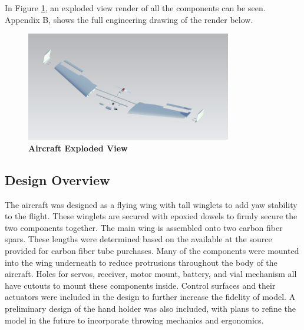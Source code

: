         In Figure \ref{fig:exploded}, an exploded view render of all the components can be seen. Appendix B, shows the full engineering drawing of the render below.
        
        \begin{figure}[H]
            \centering
            \includegraphics[width=0.8\textwidth]{homeworks/homework4/report/Figure/aircraft_assembly_exploded.png}
            \caption{\textbf{Aircraft Exploded View}}
            \label{fig:exploded}
        \end{figure}
    
    
    \subsection{Design Overview}
    
        The aircraft was designed as a flying wing with tall winglets to add yaw stability to the flight. These winglets are secured with epoxied dowels to firmly secure the two components together. The main wing is assembled onto two carbon fiber spars. These lengths were determined based on the available at the source provided for carbon fiber tube purchases. Many of the components were mounted into the wing underneath to reduce protrusions throughout the body of the aircraft. Holes for servos, receiver, motor mount, battery, and vial mechanism all have cutouts to mount these components inside. Control surfaces and their actuators were included in the design to further increase the fidelity of model. A preliminary design of the hand holder was also included, with plans to refine the model in the future to incorporate throwing mechanics and ergonomics.


